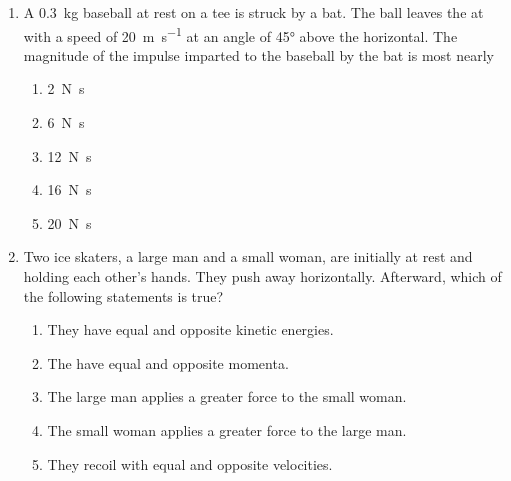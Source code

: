\documentclass{../../../oss-apphys}
\begin{document}
\begin{multicols}{2}
\begin{enumerate}[leftmargin=18pt,resume]
  \item A \SI{.3}{\kilo\gram} baseball at rest on a tee is struck by a bat. The
    ball leaves the at with a speed of \SI{20}{\metre\per\second} at an angle
    of \ang{45} above the horizontal. The magnitude of the impulse imparted to
    the baseball by the bat is most nearly
    \begin{enumerate}[nosep,leftmargin=18pt,label=(\Alph*)]
    \item\SI{2}{\newton\second}
    \item\SI{6}{\newton\second}
    \item\SI{12}{\newton\second}
    \item\SI{16}{\newton\second}
    \item\SI{20}{\newton\second}
    \end{enumerate}
    
  \item Two ice skaters, a large man and a small woman, are initially at rest
    and holding each other's hands. They push away horizontally. Afterward,
    which of the following statements is true?
    \begin{enumerate}[nosep,leftmargin=18pt,label=(\Alph*)]
    \item They have equal and opposite kinetic energies.
    \item The have equal and opposite momenta.
    \item The large man applies a greater force to the small woman.
    \item The small woman applies a greater force to the large man.
    \item They recoil with equal and opposite velocities.
    \end{enumerate}
    \vspace{.8in}
    


\end{enumerate}
\end{multicols}
\end{document}
